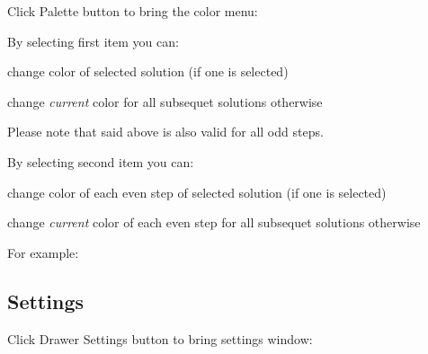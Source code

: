 \documentclass[12pt]{article}
\begin{document}
Click Palette button 
 to bring the color menu:


By selecting first item you can:

\begin{compactitem}
\item change color of selected solution (if one is selected)
\item change \textit{current} color for all subsequet solutions otherwise
\end{compactitem}

Please note that said above is also valid for all odd steps.

By selecting second item you can:

\begin{compactitem}
\item change color of each even step of selected solution (if one is selected)
\item change \textit{current} color of each even step for all subsequet solutions otherwise
\end{compactitem}

For example:



\subsection{Settings}

Click Drawer Settings button  to bring settings window:

\end{document}
